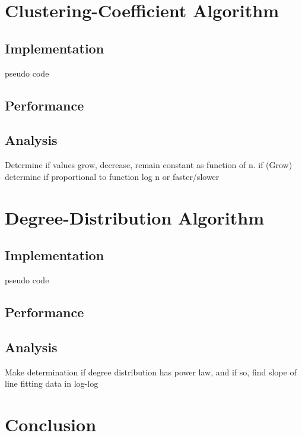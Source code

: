 \documentclass{article}
\begin{document}
\section{Clustering-Coefficient Algorithm}
\subsection{Implementation}
    pseudo code
\subsection{Performance}
\subsection{Analysis}
    Determine if values grow, decrease, remain constant as function of n.
    \nextblurb
    if (Grow) determine if proportional to function log n or faster/slower

\section{Degree-Distribution Algorithm}
\subsection{Implementation}
    pseudo code
\subsection{Performance}
\subsection{Analysis}
    Make determination if degree distribution has power law, and if so, find 
    slope of line fitting data in log-log 

\section{Conclusion}
\end{document}
